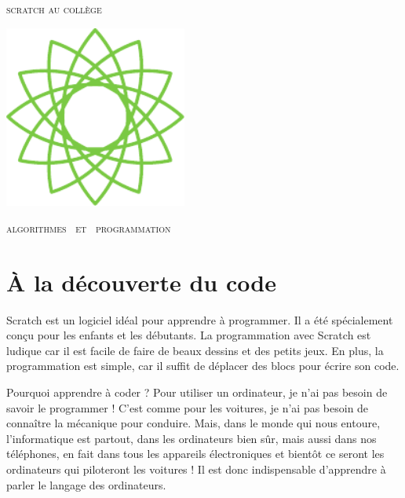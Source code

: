 
\pagestyle{empty}\thispagestyle{empty}
\vspace*{\fill}
\begin{center}
\fontsize{52}{52}\selectfont
\textsc{scratch au collège}

  \hfil
  
  \includegraphics[width = 6cm]{logoScratchAuCollege}
\end{center}
\vfill
\begin{center}
\huge
\textsc{algorithmes \  et \  programmation}
\end{center}
\begin{center}
\end{center}
\clearemptydoublepage

\thispagestyle{empty}

\vspace*{\fill}
\section*{À la découverte du code}

Scratch est un logiciel idéal pour apprendre à programmer. Il a été spécialement conçu pour les enfants et les débutants. La programmation avec Scratch est ludique car il est facile de faire de beaux dessins et des petits jeux. En plus, la programmation est simple, car il suffit de déplacer des blocs pour écrire son code.

\bigskip 

Pourquoi apprendre à coder ? Pour utiliser un ordinateur, je n'ai pas besoin de savoir le programmer ! C'est comme pour les voitures, je n'ai pas besoin de connaître la mécanique pour conduire. Mais, dans le monde qui nous entoure, l'informatique est partout, dans les ordinateurs bien sûr, mais aussi dans nos téléphones, en fait dans tous les appareils électroniques et bientôt ce seront les ordinateurs qui piloteront les voitures ! Il est donc indispensable d'apprendre à parler le langage des ordinateurs. 

